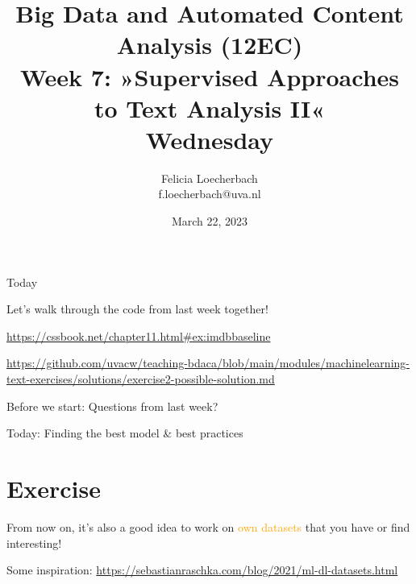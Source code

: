 \documentclass[compress]{beamer}
\begin{document}
\title[Big Data and Automated Content Analysis]{\textbf{Big Data and Automated Content Analysis (12EC)} 
\\Week 7: »Supervised Approaches to Text Analysis II«
\\Wednesday}
\author[Felicia Loecherbach]{Felicia Loecherbach\\ \footnotesize{f.loecherbach@uva.nl\\}}
\date{March 22, 2023}


\begin{frame}{}
	\titlepage
\end{frame}

\begin{frame}{Today}
	\tableofcontents
\end{frame}


\begin{frame}[standout]
Let's walk through the code from last week together!

\url{https://cssbook.net/chapter11.html\#ex:imdbbaseline}

\url{https://github.com/uvacw/teaching-bdaca/blob/main/modules/machinelearning-text-exercises/solutions/exercise2-possible-solution.md}


\end{frame}



\begin{frame}[standout]
Before we start: Questions from last week?
\end{frame}


\begin{frame}[standout]
Today: Finding the best model \& best practices
\end{frame}









\section{Exercise}

\begin{frame}[standout]
From now on, it's also a good idea to work on \textcolor{orange}{own datasets} that you have or find interesting!

Some inspiration: \url{https://sebastianraschka.com/blog/2021/ml-dl-datasets.html}

\end{frame}
\end{document}
